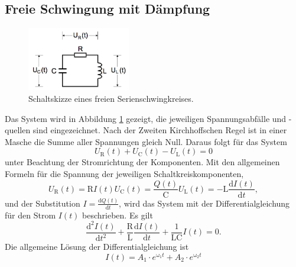 \subsection{Freie Schwingung mit Dämpfung}
\label{sec:theorie1}
\begin{figure}[h]
	\centering
	\includegraphics[width=0.4\textwidth]{Bilder/Maschenfoto1.png}
	\caption{Schaltskizze eines freien Serienschwingkreises. \cite{v354}}
	\label{fig:schaltkreis_rein}
\end{figure}
Das System wird in Abbildung \ref{fig:schaltkreis_rein} gezeigt, die jeweiligen Spannungsabfälle und -quellen sind eingezeichnet.
Nach der Zweiten Kirchhoffschen Regel ist in einer Masche die Summe aller Spannungen gleich Null. 
Daraus folgt für das System
\begin{equation}
	U_\text{R}(t)+U_\text{C}(t)-U_\text{L}(t)=0
\end{equation}
unter Beachtung der Stromrichtung der Komponenten.
Mit den allgemeinen Formeln für die Spannung der jeweiligen Schaltkreiskomponenten,
\begin{subequations}
\begin{equation}
		U_\text{R}(t) = \text{R} I(t)
\end{equation}
\begin{equation}
		U_\text{C}(t) = \frac{Q(t)}{\text{C}}
\end{equation}
\begin{equation}
		U_\text{L}(t) = -\text{L}\frac{\mathup{d}I(t)}{\mathup{d}t},
\end{equation}
\label{eq:austauscher}
\end{subequations}
und der Substitution
$I=\frac{\mathup{d}Q(t)}{\mathup{d}t}$,
wird das System mit der Differentialgleichung für den Strom $I(t)$ beschrieben.
Es gilt
\begin{equation}
	\frac{\mathup{d^2}I(t)}{\mathup{d}t^2}+\frac{\mathup{R}}{\mathup{L}}\frac{\mathup{d}I(t)}{\mathup{d}t}+\frac{1}{\mathup{LC}}I(t)=0.
\end{equation}
Die allgemeine Lösung der Differentialgleichung ist
\begin{equation}
	I(t) = A_1\cdot e^{\mathup{\omega_1}t} +A_2\cdot e^{\mathup{\omega_2}t}
	\label{eq:allgloesung}
\end{equation}
